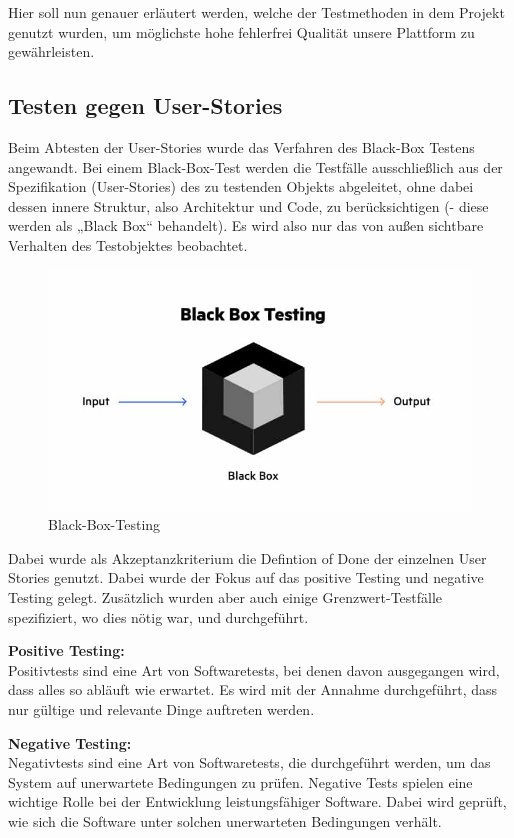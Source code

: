 Hier soll nun genauer erläutert werden, welche der Testmethoden in dem Projekt genutzt wurden, um möglichste hohe fehlerfrei Qualität unsere Plattform zu gewährleisten.

\subsection{Testen gegen User-Stories}
\label{sub:UmsetzungTestGGUserStories}

Beim Abtesten der User-Stories wurde das Verfahren des Black-Box Testens angewandt. Bei einem Black-Box-Test werden die Testfälle ausschließlich aus der Spezifikation (User-Stories) des zu testenden Objekts abgeleitet, ohne dabei dessen innere Struktur, also Architektur und Code, zu berücksichtigen (- diese werden als „Black Box“ behandelt). Es wird also nur das von außen sichtbare Verhalten des Testobjektes beobachtet.

\begin{figure}[!htb]
    \centering
    \includegraphics[width=.9\textwidth]{figures/rebecca/Black_Box_Testing.jpg}
    \caption[]{Black-Box-Testing}
    \label{fig:BlackBoxTest}
\end{figure}

Dabei wurde als Akzeptanzkriterium die Defintion of Done der einzelnen User Stories genutzt. Dabei wurde der Fokus auf das positive Testing und negative Testing gelegt. Zusätzlich wurden aber auch einige Grenzwert-Testfälle spezifiziert, wo dies nötig war, und durchgeführt.

\textbf{Positive Testing:} \\
Positivtests sind eine Art von Softwaretests, bei denen davon ausgegangen wird, dass alles so abläuft wie erwartet. Es wird mit der Annahme durchgeführt, dass nur gültige und relevante Dinge auftreten werden.

\textbf{Negative Testing:} \\
Negativtests sind eine Art von Softwaretests, die durchgeführt werden, um das System auf unerwartete Bedingungen zu prüfen. Negative Tests spielen eine wichtige Rolle bei der Entwicklung leistungsfähiger Software. Dabei wird geprüft, wie sich die Software unter solchen unerwarteten Bedingungen verhält.

